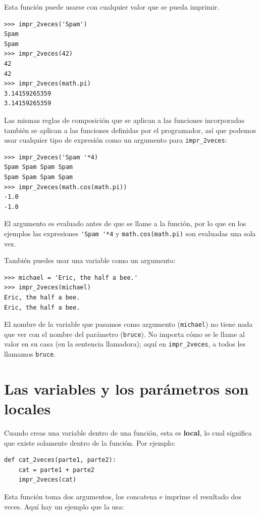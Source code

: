 \documentclass[10pt]{book}
\begin{document}
Esta función puede usarse con cualquier valor que se pueda imprimir.

\begin{verbatim}
>>> impr_2veces('Spam')
Spam
Spam
>>> impr_2veces(42)
42
42
>>> impr_2veces(math.pi)
3.14159265359
3.14159265359
\end{verbatim}
%
Las mismas reglas de composición que se aplican a las funciones incorporadas también
se aplican a las funciones definidas por el programador, así que podemos usar cualquier tipo de expresión
como un argumento para \verb"impr_2veces":

\begin{verbatim}
>>> impr_2veces('Spam '*4)
Spam Spam Spam Spam
Spam Spam Spam Spam
>>> impr_2veces(math.cos(math.pi))
-1.0
-1.0
\end{verbatim}
%
El argumento es evaluado antes de que se llame a la función, por lo que
en los ejemplos las expresiones \verb"'Spam '*4" y
{\tt math.cos(math.pi)} son evaluadas una sola vez.

También puedes usar una variable como un argumento:

\begin{verbatim}
>>> michael = 'Eric, the half a bee.'
>>> impr_2veces(michael)
Eric, the half a bee.
Eric, the half a bee.
\end{verbatim}
%
El nombre de la variable que pasamos como argumento ({\tt michael}) no tiene
nada que ver con el nombre del parámetro ({\tt bruce}).  No
importa cómo se le llame al valor en su casa (en la sentencia llamadora);
aquí en \verb"impr_2veces", a todos les llamamos {\tt bruce}.


\section{Las variables y los parámetros son locales}

Cuando creas una variable dentro de una función, esta es {\bf local},
lo cual significa que existe
solamente dentro de la función.  Por ejemplo:

\begin{verbatim}
def cat_2veces(parte1, parte2):
    cat = parte1 + parte2
    impr_2veces(cat)
\end{verbatim}
%
Esta función toma dos argumentos, los concatena e imprime
el resultado dos veces.  Aquí hay un ejemplo que la usa:
\end{document}
